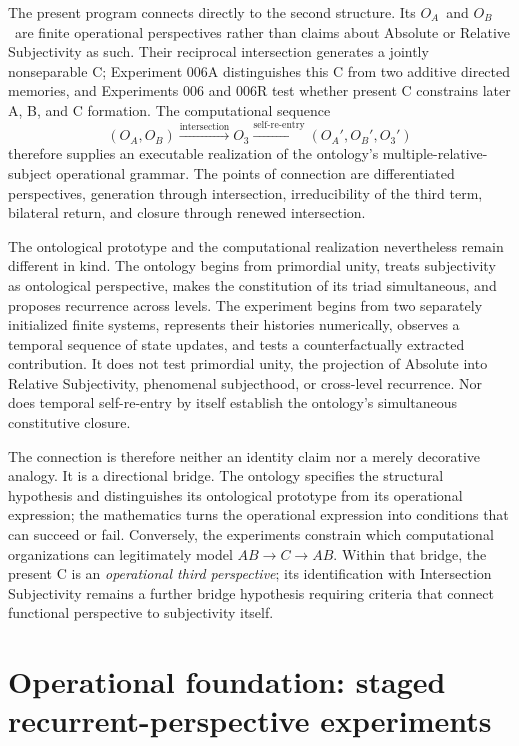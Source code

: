 \documentclass[11pt,a4paper]{article}
\newcommand{\OA}{\ensuremath{O_{A}}}
\newcommand{\OB}{\ensuremath{O_{B}}}
\newcommand{\Othree}{\ensuremath{O_{3}}}
\begin{document}
The present program connects directly to the second structure. Its \OA\ and \OB\ are finite operational perspectives rather than claims about Absolute or Relative Subjectivity as such. Their reciprocal intersection generates a jointly nonseparable C; Experiment 006A distinguishes this C from two additive directed memories, and Experiments 006 and 006R test whether present C constrains later A, B, and C formation. The computational sequence
\[
 (\OA,\OB)\xrightarrow{\text{intersection}}\Othree
 \xrightarrow{\text{self-re-entry}}(\OA',\OB',\Othree')
\]
therefore supplies an executable realization of the ontology's multiple-relative-subject operational grammar. The points of connection are differentiated perspectives, generation through intersection, irreducibility of the third term, bilateral return, and closure through renewed intersection.

The ontological prototype and the computational realization nevertheless remain different in kind. The ontology begins from primordial unity, treats subjectivity as ontological perspective, makes the constitution of its triad simultaneous, and proposes recurrence across levels. The experiment begins from two separately initialized finite systems, represents their histories numerically, observes a temporal sequence of state updates, and tests a counterfactually extracted contribution. It does not test primordial unity, the projection of Absolute into Relative Subjectivity, phenomenal subjecthood, or cross-level recurrence. Nor does temporal self-re-entry by itself establish the ontology's simultaneous constitutive closure.

The connection is therefore neither an identity claim nor a merely decorative analogy. It is a directional bridge. The ontology specifies the structural hypothesis and distinguishes its ontological prototype from its operational expression; the mathematics turns the operational expression into conditions that can succeed or fail. Conversely, the experiments constrain which computational organizations can legitimately model $AB\rightarrow C\rightarrow AB$. Within that bridge, the present C is an \emph{operational third perspective}; its identification with Intersection Subjectivity remains a further bridge hypothesis requiring criteria that connect functional perspective to subjectivity itself.

\section{Operational foundation: staged recurrent-perspective experiments}
\end{document}
